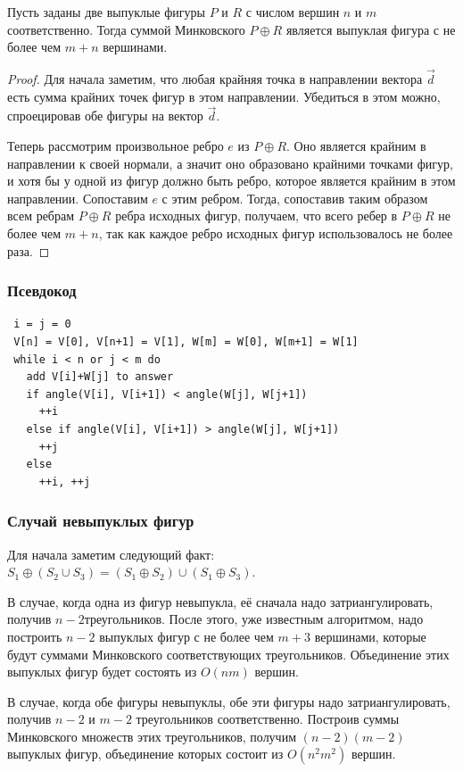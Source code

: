 \begin{theorem}
    Пусть заданы две выпуклые фигуры $P$ и $R$ с числом вершин $n$ и $m$ соответственно.
    Тогда суммой Минковского $P \oplus R$ является выпуклая фигура с не более чем $m+n$ вершинами.
\end{theorem}
\begin{proof}
    Для начала заметим, что любая крайняя точка в направлении вектора $\vec{d}$ есть сумма крайних точек фигур в этом направлении.
    Убедиться в этом можно, спроецировав обе фигуры на вектор $\vec{d}$.

    Теперь рассмотрим произвольное ребро $e$ из $P \oplus R$. 
    Оно является крайним в направлении к своей нормали, а значит оно образовано крайними точками фигур, и хотя бы у одной из фигур должно быть ребро, которое является крайним в этом направлении.
    Сопоставим $e$ с этим ребром.
    Тогда, сопоставив таким образом всем ребрам $P \oplus R$ ребра исходных фигур, получаем, что всего ребер в $P \oplus R$ не более чем $m+n$, так как каждое ребро исходных фигур использовалось не более раза. 
\end{proof}

\subsubsection{Псевдокод}

\begin{verbatim}
 i = j = 0
 V[n] = V[0], V[n+1] = V[1], W[m] = W[0], W[m+1] = W[1]
 while i < n or j < m do
   add V[i]+W[j] to answer
   if angle(V[i], V[i+1]) < angle(W[j], W[j+1])
     ++i
   else if angle(V[i], V[i+1]) > angle(W[j], W[j+1])
     ++j
   else
     ++i, ++j
\end{verbatim}

\subsubsection{Случай невыпуклых фигур}

Для начала заметим следующий факт: $S_1 \oplus (S_2 \cup S_3)=(S_1 \oplus S_2) \cup (S_1 \oplus S_3)$.

В случае, когда одна из фигур невыпукла, её сначала надо затриангулировать, получив $n-2$треугольников.
После этого, уже известным алгоритмом, надо построить $n-2$ выпуклых фигур с не более чем $m+3$ вершинами, которые будут суммами Минковского соответствующих треугольников.
Объединение этих выпуклых фигур будет состоять из $O(nm)$ вершин.

В случае, когда обе фигуры невыпуклы, обе эти фигуры надо затриангулировать, получив $n-2$ и $m-2$ треугольников соответственно.
Построив суммы Минковского множеств этих треугольников, получим $(n-2)(m-2)$ выпуклых фигур, объединение которых состоит из $O(n^2m^2)$ вершин. 